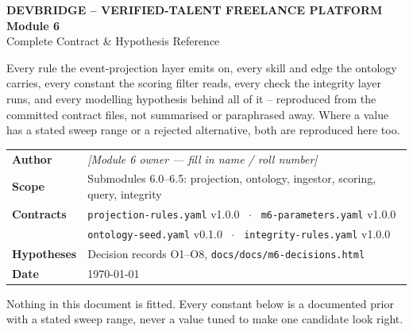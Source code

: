 \documentclass[10pt,a4paper]{article}
\begin{document}
\begin{titlepage}
\centering
\vspace*{2cm}
{\sffamily\footnotesize\bfseries\color{mutedgray}\MakeUppercase{DevBridge --
Verified-Talent Freelance Platform}}\\[1.4cm]
{\sffamily\Huge\bfseries\color{accent} Module 6}\\[0.35cm]
{\sffamily\Large\color{inkgray} Complete Contract \& Hypothesis Reference}\\[2cm]

\vspace{1.2cm}

{\sffamily\normalsize\color{inkgray}
Every rule the event-projection layer emits on, every skill and edge the
ontology carries, every constant the scoring filter reads, every check the
integrity layer runs, and every modelling hypothesis behind all of it --
reproduced from the committed contract files, not summarised or
paraphrased away. Where a value has a stated sweep range or a rejected
alternative, both are reproduced here too.}

\vspace{2.2cm}
\begin{tabular}{ll}
\sffamily\bfseries\color{mutedgray} Author     & \emph{[Module 6 owner --- fill in name / roll number]} \\[4pt]
\sffamily\bfseries\color{mutedgray} Scope      & Submodules 6.0--6.5: projection, ontology, ingestor, scoring, query, integrity \\[4pt]
\sffamily\bfseries\color{mutedgray} Contracts  & \texttt{projection-rules.yaml} v1.0.0 \ $\cdot$ \ \texttt{m6-parameters.yaml} v1.0.0 \\
           & \texttt{ontology-seed.yaml} v0.1.0 \ $\cdot$ \ \texttt{integrity-rules.yaml} v1.0.0 \\[4pt]
\sffamily\bfseries\color{mutedgray} Hypotheses & Decision records O1--O8, \texttt{docs/docs/m6-decisions.html} \\[4pt]
\sffamily\bfseries\color{mutedgray} Date       & \today \\
\end{tabular}
\vfill
{\small\color{mutedgray}\sffamily Nothing in this document is fitted. Every
constant below is a documented prior with a stated sweep range, never a value
tuned to make one candidate look right.}
\end{titlepage}
\end{document}
